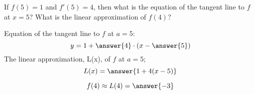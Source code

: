 \documentclass{ximera}
\author{Steven Gubkin\and Nela Lakos}
\begin{document}
\begin{exercise}
If $f(5)=1$ and $f'(5) = 4$, then what is the equation of the tangent
line to $f$ at $x=5$?  What is the linear approximation of $f(4)$?

\begin{prompt}
Equation of the tangent line to $f$ at $a=5$:
 $$y = 1+\answer{4}\cdot(x-\answer{5})$$
The linear approximation, L(x), of $f$ at $a=5$;
  $$L(x) = \answer{1+4(x-5)}$$
  
  $$f(4) \approx L(4)= \answer{-3}$$
\end{prompt}



\end{exercise}
\end{document}
